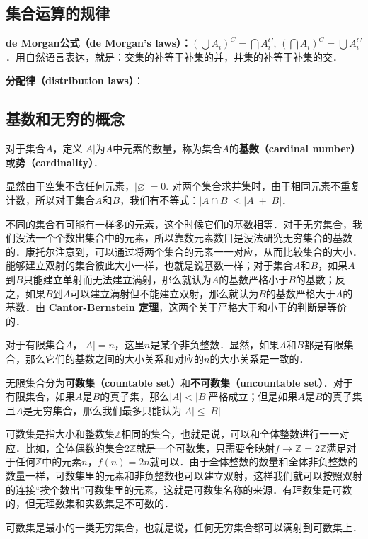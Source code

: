 \subsection{集合运算的规律}

\textbf{de Morgan公式（de Morgan's laws）：}$(\bigcup A_i)^C=\bigcap A_i^C$, $(\bigcap A_i)^C=\bigcup A_i^C$．用自然语言表达，就是：交集的补等于补集的并，并集的补等于补集的交．

\textbf{分配律（distribution laws）}：

\subsection{基数和无穷的概念}

对于集合$A$，定义$|A|$为$A$中元素的数量，称为集合$A$的\textbf{基数（cardinal number）}或\textbf{势（cardinality）}．

显然由于空集不含任何元素，$|\varnothing|=0$. 对两个集合求并集时，由于相同元素不重复计数，所以对于集合$A$和$B$，我们有不等式：$|A\cap B|\le|A|+|B|$．

不同的集合有可能有一样多的元素，这个时候它们的基数相等．对于无穷集合，我们没法一个个数出集合中的元素，所以靠数元素数目是没法研究无穷集合的基数的．康托尔注意到，可以通过将两个集合的元素一一对应，从而比较集合的大小．能够建立双射的集合彼此大小一样，也就是说基数一样；对于集合$A$和$B$，如果$A$到$B$只能建立单射而无法建立满射，那么就认为$A$的基数严格小于$B$的基数；反之，如果$B$到$A$可以建立满射但不能建立双射，那么就认为$B$的基数严格大于$A$的基数．由 \textbf{Cantor-Bernstein 定理}，这两个关于严格大于和小于的判断是等价的．

对于有限集合$A$，$|A|=n$，这里$n$是某个非负整数．显然，如果$A$和$B$都是有限集合，那么它们的基数之间的大小关系和对应的$n$的大小关系是一致的．

无限集合分为\textbf{可数集（countable set）}和\textbf{不可数集（uncountable set）}．对于有限集合，如果$A$是$B$的真子集，那么$|A|<|B|$严格成立；但是如果$A$是$B$的真子集且$A$是无穷集合，那么我们最多只能认为$|A|\le|B|$

可数集是指大小和整数集$\mathbb{Z}$相同的集合，也就是说，可以和全体整数进行一一对应．比如，全体偶数的集合$2\mathbb{Z}$就是一个可数集，只需要令映射$f\rightarrow \mathbb{Z}=2\mathbb{Z}$满足对于任何$\mathbb{Z}$中的元素$n$，$f(n)=2n$就可以．由于全体整数的数量和全体非负整数的数量一样，可数集里的元素和非负整数也可以建立双射，这样我们就可以按照双射的连接“挨个数出”可数集里的元素，这就是可数集名称的来源．有理数集是可数的，但无理数集和实数集是不可数的．

可数集是最小的一类无穷集合，也就是说，任何无穷集合都可以满射到可数集上．

